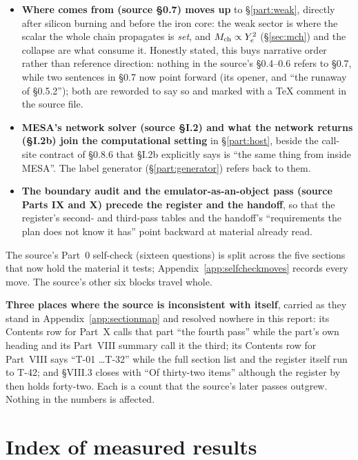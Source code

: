 \begin{itemize}
\item \textbf{Where \Ye{} comes from (source \S0.7) moves up} to
  \S\ref{part:weak}, directly after silicon burning and before the iron core:
  the weak sector is where the scalar the whole chain propagates is \emph{set},
  and $M_{\mathrm{ch}} \propto Y_{e}^2$ (\S\ref{sec:mch}) and the collapse are what consume it.
  Honestly stated, this buys narrative order rather than reference direction:
  nothing in the source's \S0.4--0.6 refers to \S0.7, while two sentences in
  \S0.7 now point forward (its opener, and ``the runaway of \S0.5.2''); both
  are reworded to say so and marked with a TeX comment in the source file.
\item \textbf{MESA's network solver (source \S I.2) and what the network
  returns (\S I.2b) join the computational setting} in \S\ref{part:host},
  beside the call-site contract of \S0.8.6 that \S I.2b explicitly says is
  ``the same thing from inside MESA''. The label generator
  (\S\ref{part:generator}) refers back to them.
\item \textbf{The boundary audit and the emulator-as-an-object pass (source
  Parts IX and X) precede the register and the handoff}, so that the
  register's second- and third-pass tables and the handoff's ``requirements the
  plan does not know it has'' point backward at material already read.
\end{itemize}

The source's Part~0 self-check (sixteen questions) is split across the five
sections that now hold the material it tests; Appendix~\ref{app:selfcheckmoves}
records every move. The source's other six blocks travel whole.

\begin{aside}
\textbf{Three places where the source is inconsistent with itself}, carried as
they stand in Appendix~\ref{app:sectionmap} and resolved nowhere in this
report: its Contents row for Part~X calls that part ``the fourth pass'' while
the part's own heading and its Part~VIII summary call it the third; its
Contents row for Part~VIII says ``T-01 \ldots T-32'' while the full section
list and the register itself run to T-42; and \S VIII.3 closes with ``Of
thirty-two items'' although the register by then holds forty-two. Each is a
count that the source's later passes outgrew. Nothing in the numbers is
affected.
\end{aside}

\section*{Index of measured results}
\label{sec:resultsindex}

